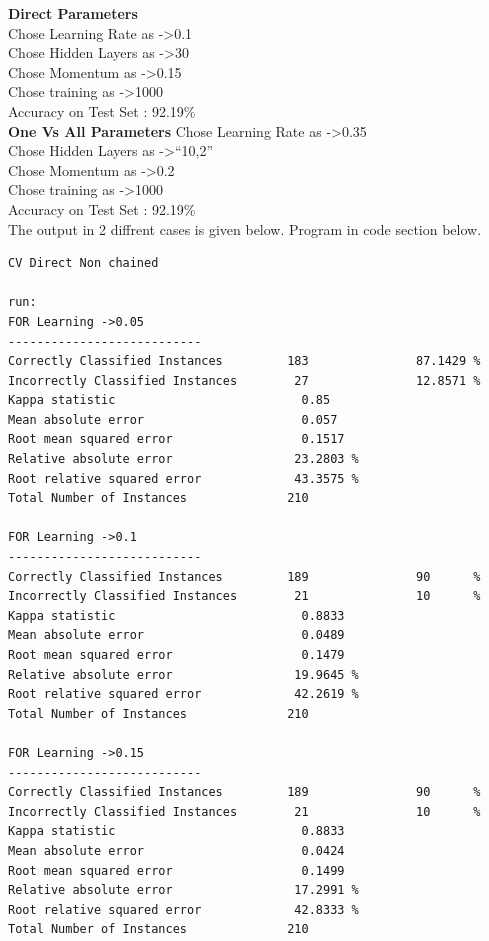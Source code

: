 \documentclass[fontsize=10pt,DIV=14]{scrartcl}
\begin{document}
\begin{itemize}
		\textbf{Direct Parameters} \\
		Chose Learning Rate as ->0.1 \\
		Chose Hidden Layers as ->30 \\
		Chose Momentum as ->0.15 \\
		Chose training as ->1000 \\
		Accuracy on Test Set : 92.19\% \\

		\textbf{One Vs All Parameters}
		Chose Learning Rate as ->0.35 \\
		Chose Hidden Layers as ->``10,2'' \\
		Chose Momentum as ->0.2 \\
		Chose training as ->1000 \\
		Accuracy on Test Set : 92.19\% \\

		The output in 2 diffrent cases is given below. Program in code section below.

\begin{verbatim}
CV Direct Non chained

run:
FOR Learning ->0.05 
---------------------------
Correctly Classified Instances         183               87.1429 %
Incorrectly Classified Instances        27               12.8571 %
Kappa statistic                          0.85  
Mean absolute error                      0.057 
Root mean squared error                  0.1517
Relative absolute error                 23.2803 %
Root relative squared error             43.3575 %
Total Number of Instances              210     

FOR Learning ->0.1 
---------------------------
Correctly Classified Instances         189               90      %
Incorrectly Classified Instances        21               10      %
Kappa statistic                          0.8833
Mean absolute error                      0.0489
Root mean squared error                  0.1479
Relative absolute error                 19.9645 %
Root relative squared error             42.2619 %
Total Number of Instances              210     

FOR Learning ->0.15 
---------------------------
Correctly Classified Instances         189               90      %
Incorrectly Classified Instances        21               10      %
Kappa statistic                          0.8833
Mean absolute error                      0.0424
Root mean squared error                  0.1499
Relative absolute error                 17.2991 %
Root relative squared error             42.8333 %
Total Number of Instances              210     


\end{verbatim}
\end{itemize}
\end{document}
